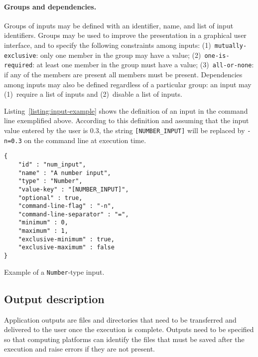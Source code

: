 \documentclass{article}
\begin{document}
\paragraph{Groups and dependencies.} Groups of inputs may be defined
with an identifier, name, and list of input identifiers. Groups may be
used to improve the presentation in a graphical user interface, and to
specify the following constraints among inputs:
(1)~\texttt{mutually-exclusive}: only one member in the group may have
a value; (2)~\texttt{one-is-required}: at least one member in the
group must have a value; (3)~\texttt{all-or-none}: if any of the
members are present all members must be present. Dependencies among
inputs may also be defined regardless of a particular group: an input
may (1)~require a list of inputs and (2)~disable a list of inputs.

Listing~\ref{listing:input-example} shows the definition of an input in the
command line exemplified above. According to this definition and assuming
that the input value entered by the user is 0.3, the string
\texttt{[NUMBER\_INPUT]} will be replaced by \texttt{-n=0.3} on the command
line at execution time.
\begin{listing}
\begin{verbatim}
{
    "id" : "num_input",
    "name" : "A number input",
    "type" : "Number",
    "value-key" : "[NUMBER_INPUT]",
    "optional" : true,
    "command-line-flag" : "-n",
    "command-line-separator" : "=",
    "minimum" : 0,
    "maximum" : 1,
    "exclusive-minimum" : true,
    "exclusive-maximum" : false
}
\end{verbatim}
\caption{Example of a \texttt{Number}-type input.} 
\label{listing:input-example}
\end{listing}

\subsection{Output description}

Application outputs are files and directories that need to be
transferred and delivered to the user once the execution is
complete. Outputs need to be specified so that computing platforms can
identify the files that must be saved after the execution and raise
errors if they are not present.
\end{document}
